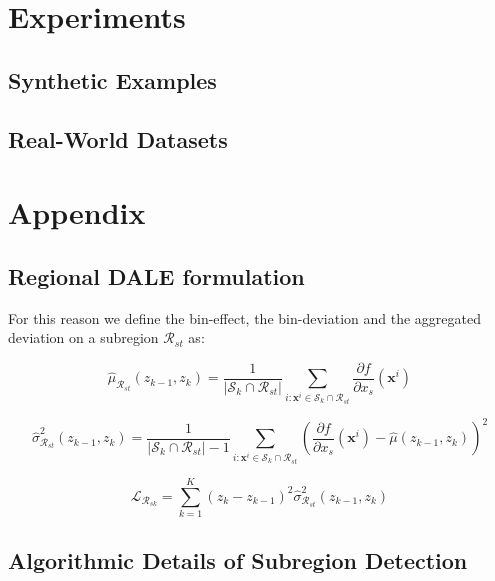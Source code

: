 \documentclass[12pt]{article}
\newcommand{\dfdx}{\frac{\partial f}{\partial x_s}}
\begin{document}
\section{Experiments}

\subsection{Synthetic Examples}

\subsection{Real-World Datasets}





\section{Appendix}

\subsection{Regional DALE formulation}
\label{sec:regional_dale}

For this reason we define the bin-effect, the bin-deviation and the aggregated deviation on a subregion \(\mathcal{R}_{st}\) as:

\begin{equation}
    \label{eq:bin_effect_subregion}
    \hat{\mu}_{\mathcal{R}_{st}}(z_{k-1}, z_k) = \frac{1}{|\mathcal{S}_k \cap \mathcal{R}_{st}|} \sum_{i:\mathbf{x}^i \in \mathcal{S}_k \cap \mathcal{R}_{st} } \dfdx(\mathbf{x}^i)
\end{equation}

\begin{equation}
  \label{eq:bin_deviation_subregion}
  \hat{\sigma}_{\mathcal{R}_{st}}^2(z_{k-1}, z_k) = \frac{1}{|\mathcal{S}_k \cap \mathcal{R}_{st}| - 1}
\sum_{i:\mathbf{x}^i \in \mathcal{S}_k \cap \mathcal{R}_{st} } \left ( \dfdx(\mathbf{x}^i) -
    \hat{\mu}(z_{k-1}, z_k) \right )^2
\end{equation}

\begin{equation}
  \label{eq:SE}
  \mathcal{L}_{\mathcal{R}_{sk}} = \sum_{k=1}^K (z_k - z_{k-1})^2 \hat{\sigma}_{\mathcal{R}_{st}}^2(z_{k-1}, z_k)
\end{equation}


\subsection{Algorithmic Details of Subregion Detection}
\end{document}
